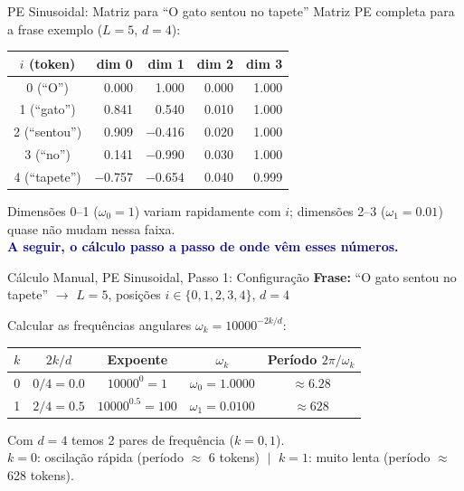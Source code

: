\documentclass[aspectratio=169, xcolor=dvipsnames]{beamer}
\begin{document}
  \begin{frame}{PE Sinusoidal: Matriz para ``O gato sentou no tapete''}
    Matriz PE completa para a frase exemplo ($L=5$, $d=4$):

    \vspace{0.3em}
    \centering
    \begin{tabular}{c|rrrr}
      \toprule
      \textbf{$i$ (token)} & \textbf{dim 0} & \textbf{dim 1} & \textbf{dim 2} & \textbf{dim 3} \\
      \midrule
      \rowcolor{CellGreen} 0 (``O'')      &  0.000 &  1.000 & 0.000 & 1.000 \\
      \rowcolor{CellGreen} 1 (``gato'')   &  0.841 &  0.540 & 0.010 & 1.000 \\
      \rowcolor{CellGreen} 2 (``sentou'') &  0.909 & $-$0.416 & 0.020 & 1.000 \\
      \rowcolor{CellGreen} 3 (``no'')     &  0.141 & $-$0.990 & 0.030 & 1.000 \\
      \rowcolor{CellGreen} 4 (``tapete'') & $-$0.757 & $-$0.654 & 0.040 & 0.999 \\
      \bottomrule
    \end{tabular}

    \vspace{0.5em}
    \flushleft
    Dimensões 0--1 ($\omega_0{=}1$) variam rapidamente com $i$; dimensões 2--3 ($\omega_1{=}0.01$) quase não mudam nessa faixa.\\
    \textcolor{DarkBlue}{\textbf{A seguir, o cálculo passo a passo de onde vêm esses números.}}
  \end{frame}

  \begin{frame}{Cálculo Manual, PE Sinusoidal, Passo 1: Configuração}
    \textbf{Frase:} ``O gato sentou no tapete'' $\to$ $L = 5$, posições $i \in \{0, 1, 2, 3, 4\}$, $d = 4$

    \vspace{0.3em}
    Calcular as frequências angulares $\omega_k = 10000^{-2k/d}$:

    \vspace{0.3em}
    \centering
    \begin{tabular}{ccccc}
      \toprule
      $k$ & $2k/d$ & Expoente & $\omega_k$ & Período $2\pi/\omega_k$ \\
      \midrule
      \rowcolor{CellGreen} 0 & $0/4 = 0.0$  & $10000^0 = 1$   & $\omega_0 = 1.0000$ & $\approx 6.28$ \\
      \rowcolor{CellGreen} 1 & $2/4 = 0.5$  & $10000^{0.5} = 100$ & $\omega_1 = 0.0100$ & $\approx 628$ \\
      \bottomrule
    \end{tabular}

    \vspace{0.5em}
    \flushleft
    Com $d=4$ temos 2 pares de frequência ($k = 0, 1$).\\
    $k{=}0$: oscilação rápida (período $\approx$ 6 tokens) $\;|\;$ $k{=}1$: muito lenta (período $\approx$ 628 tokens).
  \end{frame}
\end{document}
